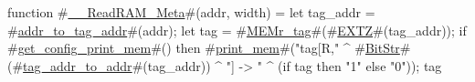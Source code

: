 function #\hyperref[sailRISCVzzyzyReadRAMzyMeta]{\_\_ReadRAM\_Meta}#(addr, width) = {
  let tag_addr = #\hyperref[sailRISCVzaddrzytozytagzyaddr]{addr\_to\_tag\_addr}#(addr);
  let tag = #\hyperref[sailRISCVzMEMrzytag]{MEMr\_tag}#(#\hyperref[sailRISCVzEXTZ]{EXTZ}#(tag_addr));
  if #\hyperref[sailRISCVzgetzyconfigzyprintzymem]{get\_config\_print\_mem}#() then
    #\hyperref[sailRISCVzprintzymem]{print\_mem}#("tag[R," ^ #\hyperref[sailRISCVzBitStr]{BitStr}#(#\hyperref[sailRISCVztagzyaddrzytozyaddr]{tag\_addr\_to\_addr}#(tag_addr)) ^ "] -> " ^ (if tag then "1" else "0"));
  tag
}
